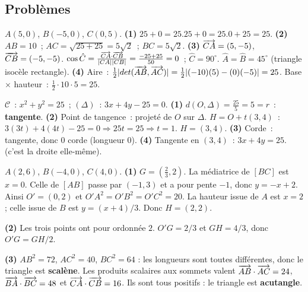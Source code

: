 \subsection*{Probl\`emes}


$A(5,0)$, $B(-5,0)$, $C(0,5)$.
\textbf{(1)} $25+0=25$.\checkmark\quad $25+0=25$.\checkmark\quad $0+25=25$.\checkmark
\textbf{(2)} $AB=10$~; $AC=\sqrt{25+25}=5\sqrt{2}$~; $BC=5\sqrt{2}$.
\textbf{(3)} $\overrightarrow{CA}=(5,-5)$, $\overrightarrow{CB}=(-5,-5)$.
$\cos\hat{C}=\frac{\overrightarrow{CA}\cdot\overrightarrow{CB}}{|CA||CB|}=\frac{-25+25}{50}=0$~; $\hat{C}=90^{\circ}$.
$\hat{A}=\hat{B}=45^{\circ}$ (triangle isoc\`ele rectangle).
\textbf{(4)} Aire~: $\frac{1}{2}|det(\overrightarrow{AB},\overrightarrow{AC})|=\frac{1}{2}|(-10)(5)-(0)(-5)|=25$.
Base $\times$ hauteur~: $\frac{1}{2}\cdot10\cdot5=25$.\checkmark


$\mathcal{C}$~: $x^2+y^2=25$~; $(\Delta)$~: $3x+4y-25=0$.
\textbf{(1)} $d(O,\Delta)=\frac{25}{5}=5=r$~: \textbf{tangente}.
\textbf{(2)} Point de tangence~: projet\'e de $O$ sur $\Delta$.
$H=O+t(3,4)$~: $3(3t)+4(4t)-25=0\Rightarrow25t=25\Rightarrow t=1$.
$H=(3,4)$.
\textbf{(3)} Corde~: tangente, donc 0 corde (longueur 0).
\textbf{(4)} Tangente en $(3,4)$~: $3x+4y=25$.\checkmark (c'est la droite elle-m\^eme).


$A(2,6)$, $B(-4,0)$, $C(4,0)$.
\textbf{(1)} $G=(\frac23,2)$.
La m\'ediatrice de $[BC]$ est $x=0$. Celle de $[AB]$ passe par $(-1,3)$
et a pour pente $-1$, donc $y=-x+2$. Ainsi $O'=(0,2)$ et
$O'A^2=O'B^2=O'C^2=20$.
La hauteur issue de $A$ est $x=2$; celle issue de $B$ est
$y=(x+4)/3$. Donc $H=(2,2)$.

\textbf{(2)} Les trois points ont pour ordonn\'ee $2$.
$O'G=2/3$ et $GH=4/3$, donc $O'G=GH/2$.

\textbf{(3)} $AB^2=72$, $AC^2=40$, $BC^2=64$ : les longueurs sont
 toutes diff\'erentes, donc le triangle est \textbf{scal\`ene}.
Les produits scalaires aux sommets valent
$\overrightarrow{AB}\cdot\overrightarrow{AC}=24$, $\overrightarrow{BA}\cdot\overrightarrow{BC}=48$ et
$\overrightarrow{CA}\cdot\overrightarrow{CB}=16$. Ils sont tous positifs : le triangle est \textbf{acutangle}.

